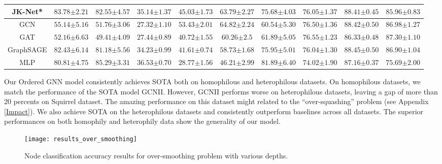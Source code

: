\documentclass{article}
\begin{document}
\begin{table}
{\begin{tabular}{c|cccccc|ccc}
JK-Net* & $83.78{\scriptstyle\pm2.21}$ & $82.55{\scriptstyle\pm4.57}$ & $35.14{\scriptstyle\pm1.37}$ & $45.03{\scriptstyle\pm1.73}$ & $63.79{\scriptstyle\pm2.27}$ & $75.68{\scriptstyle\pm4.03}$ & $76.05{\scriptstyle\pm1.37}$ & $88.41{\scriptstyle\pm0.45}$ & $85.96{\scriptstyle\pm0.83}$ \\
\midrule
GCN & $55.14{\scriptstyle\pm5.16}$ & $51.76{\scriptstyle\pm3.06}$ &  $27.32{\scriptstyle\pm1.10}$ & $53.43{\scriptstyle\pm2.01}$ & $64.82{\scriptstyle\pm2.24}$ &
$60.54{\scriptstyle\pm5.30}$ &  $76.50{\scriptstyle\pm1.36}$ & $88.42{\scriptstyle\pm0.50}$ & $86.98{\scriptstyle\pm1.27}$ \\
GAT & $52.16{\scriptstyle\pm6.63}$ & $49.41{\scriptstyle\pm4.09}$ & $27.44{\scriptstyle\pm0.89}$ & $40.72{\scriptstyle\pm1.55}$ & $60.26{\scriptstyle\pm2.5}$ & $61.89{\scriptstyle\pm5.05}$ &  $76.55{\scriptstyle\pm1.23}$ & $86.33{\scriptstyle\pm0.48}$ & $87.30{\scriptstyle\pm1.10}$ \\
GraphSAGE & $82.43{\scriptstyle\pm6.14}$ & $81.18{\scriptstyle\pm5.56}$ & $34.23{\scriptstyle\pm0.99}$ & $41.61{\scriptstyle\pm0.74}$ & $58.73{\scriptstyle\pm1.68}$ & $75.95{\scriptstyle\pm5.01}$ &  $76.04{\scriptstyle\pm1.30}$ & $88.45{\scriptstyle\pm0.50}$ & $86.90{\scriptstyle\pm1.04}$ \\
\midrule
MLP & $80.81{\scriptstyle\pm4.75}$ & $85.29{\scriptstyle\pm3.31}$ & $36.53{\scriptstyle\pm0.70}$ & $28.77{\scriptstyle\pm1.56}$ & $46.21{\scriptstyle\pm2.99}$ & $81.89{\scriptstyle\pm6.40}$ &  $74.02{\scriptstyle\pm1.90}$ & $87.16{\scriptstyle\pm0.37}$ & $75.69{\scriptstyle\pm2.00}$ \\
\bottomrule
\end{tabular}
}
\end{table}

Our Ordered GNN model consistently achieves SOTA both on homophilous and heterophilous datasets. On homophilous datasets, we match the performance of the SOTA model GCNII. However, GCNII performs worse on heterophilous datasets, leaving a gap of more than 20 percents on Squirrel dataset. The amazing performance on this dataset might related to the ``over-squashing'' problem \citep{alon2020bottleneck,topping2021understanding} (see Appendix \ref{Impact}). We also achieve SOTA on the heterophilous datasets and consistently outperform baselines across all datasets. The superior performances on both homophily and heterophily data show the generality of our model.


\begin{figure}\centering
\texttt{[image: results\_over\_smoothing]}
\caption{Node classification accuracy results for over-smoothing problem with various depths.}
\label{fig.results_over_smoothing}
\end{figure}
\end{document}
